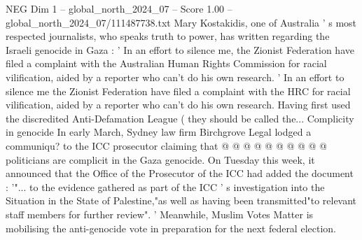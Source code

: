 \begin{textsample}{NEG Dim 1 – global\_north\_2024\_07 – Score 1.00 – global\_north\_2024\_07/111487738.txt}
Mary Kostakidis, one of Australia ' s most respected journalists, who speaks truth to power, has written regarding the Israeli genocide in Gaza : ' In an effort to silence me, the Zionist Federation have filed a complaint with the Australian Human Rights Commission for racial vilification, aided by a reporter who can't do his own research. ' In an effort to silence me the Zionist Federation have filed a complaint with the HRC for racial vilification, aided by a reporter who can't do his own research.
Having first used the discredited Anti-Defamation League ( they should be called the...
Complicity in genocide In early March, Sydney law firm Birchgrove Legal lodged a communiqu? to the ICC prosecutor claiming that @ @ @ @ @ @ @ @ @ @ politicians are complicit in the Gaza genocide.
On Tuesday this week, it announced that the Office of the Prosecutor of the ICC had added the document : '"... to the evidence gathered as part of the ICC ' s investigation into the Situation in the State of Palestine,"as well as having been transmitted"to relevant staff members for further review". ' Meanwhile, Muslim Votes Matter is mobilising the anti-genocide vote in preparation for the next federal election.

\end{textsample}
